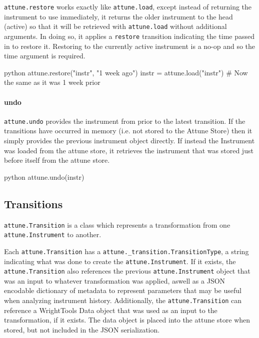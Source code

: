 \texttt{attune.restore} works exactly like \texttt{attune.load}, except
instead of returning the instrument to use immediately, it returns the
older instrument to the head (active) so that it will be retrieved with
\texttt{attune.load} without additional arguments. In doing so, it
applies a \texttt{restore} transition indicating the time passed in to
restore it. Restoring to the currently active instrument is a no-op and
so the time argument is required.

\begin{codefragment}{python}
attune.restore("instr", "1 week ago")
instr = attune.load("instr")  # Now the same as it was 1 week prior
\end{codefragment}

\hypertarget{undo}{%
\paragraph{undo}\label{undo}}

\texttt{attune.undo} provides the instrument from prior to the latest
transition. If the transitions have occurred in memory (i.e. not stored
to the Attune Store) then it simply provides the previous instrument
object directly. If instead the Instrument was loaded from the attune
store, it retrieves the instrument that was stored just before itself
from the attune store.

\begin{codefragment}{python}
attune.undo(instr)
\end{codefragment}


\hypertarget{transitions}{%
\subsection{Transitions}\label{transitions}}

\texttt{attune.Transition} is a class which represents
a transformation from one \texttt{attune.Instrument} to
another.

Each \texttt{attune.Transition} has a
\texttt{attune.\_transition.TransitionType}, a string
indicating what was done to create the
\texttt{attune.Instrument}. If it exists, the
\texttt{attune.Transition} also references the previous
\texttt{attune.Instrument} object that was an input to
whatever transformation was applied, aswell as a JSON encodable
dictionary of metadata to represent parameters that may be useful when
analyzing instrument history. Additionally, the
\texttt{attune.Transition} can reference a WrightTools
Data object that was used as an input to the transformation, if it
exists. The data object is placed into the attune store when stored, but
not included in the JSON serialization.

